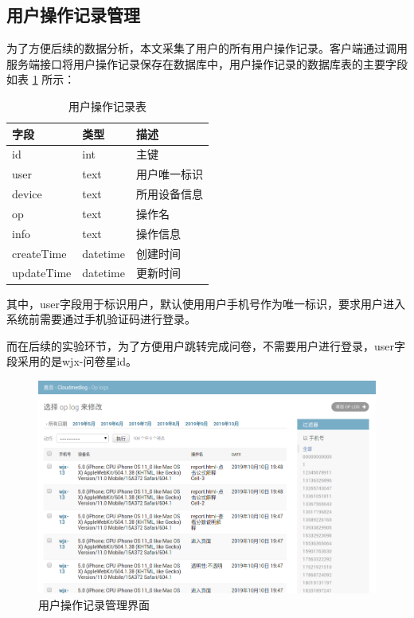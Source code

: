 \subsection{用户操作记录管理}
为了方便后续的数据分析，本文采集了用户的所有用户操作记录。客户端通过调用服务端接口将用户操作记录保存在数据库中，用户操作记录的数据库表的主要字段如表 \ref{tab:op_log} 所示：

\begin{table}[]
    \centering
    \begin{tabular}{lll}
        \toprule
        字段 & 类型 & 描述 \\ 
        \midrule
        id & int & 主键 \\
        user & text & 用户唯一标识 \\ 
        device & text & 所用设备信息 \\
        op & text & 操作名 \\
        info & text & 操作信息 \\
        createTime & datetime & 创建时间 \\
        updateTime & datetime & 更新时间\\
        \bottomrule
    \end{tabular}
    \caption{用户操作记录表}
    \label{tab:op_log}
\end{table}


其中，user字段用于标识用户，默认使用用户手机号作为唯一标识，要求用户进入系统前需要通过手机验证码进行登录。

而在后续的实验环节，为了方便用户跳转完成问卷，不需要用户进行登录，user字段采用的是wjx-问卷星id。

\begin{figure}[ht]
    \centering
    \includegraphics[width=12cm]{images/op_log.png}
    \caption{用户操作记录管理界面}
    \label{fig:op_log}
\end{figure}

